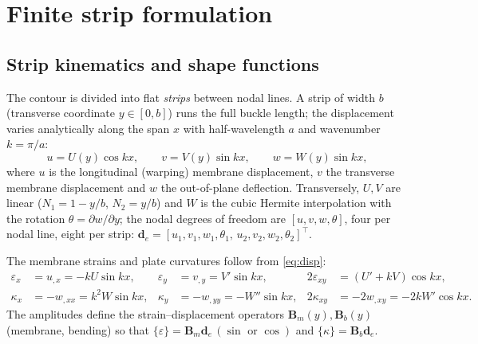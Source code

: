 \section{Finite strip formulation}\label{sec:fsm}

\subsection{Strip kinematics and shape functions}\label{sec:kin}
The contour is divided into flat \emph{strips} between nodal lines. A strip of width $b$ (transverse
coordinate $y\in[0,b]$) runs the full buckle length; the displacement varies analytically along the span
$x$ with half-wavelength $a$ and wavenumber $k=\pi/a$:
\begin{equation}
u=U(y)\cos kx,\qquad v=V(y)\sin kx,\qquad w=W(y)\sin kx ,
\label{eq:disp}
\end{equation}
where $u$ is the longitudinal (warping) membrane displacement, $v$ the transverse membrane displacement and
$w$ the out-of-plane deflection. Transversely, $U,V$ are linear ($N_1=1-y/b$, $N_2=y/b$) and $W$ is the
cubic Hermite interpolation with the rotation $\theta=\partial w/\partial y$; the nodal degrees of freedom
are $[u,v,w,\theta]$, four per nodal line, eight per strip:
$\mathbf d_e=[u_1,v_1,w_1,\theta_1,\,u_2,v_2,w_2,\theta_2]^{\!\top}$.

The membrane strains and plate curvatures follow from \eqref{eq:disp}:
\begin{align}
\varepsilon_x&=u_{,x}=-kU\sin kx, & \varepsilon_y&=v_{,y}=V'\sin kx, &
2\varepsilon_{xy}&=(U'+kV)\cos kx,\label{eq:mem}\\
\kappa_x&=-w_{,xx}=k^2W\sin kx, & \kappa_y&=-w_{,yy}=-W''\sin kx, &
2\kappa_{xy}&=-2w_{,xy}=-2kW'\cos kx.\label{eq:bend}
\end{align}
The amplitudes define the strain--displacement operators $\mathbf B_m(y),\mathbf B_b(y)$ (membrane, bending)
so that $\{\varepsilon\}=\mathbf B_m\mathbf d_e\,(\sin\text{ or }\cos)$ and
$\{\kappa\}=\mathbf B_b\mathbf d_e$.

